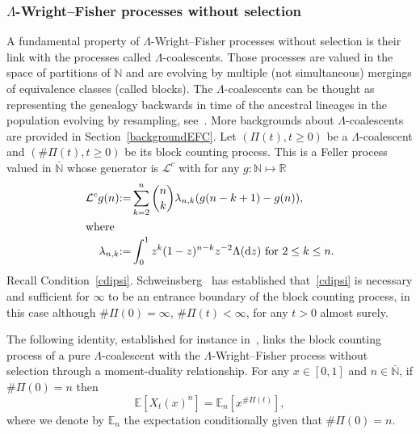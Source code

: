 \documentclass[10pt]{amsart}
\theoremstyle{definition}\newtheorem{defi}[theo]{Definition}\newtheorem{rema}[theo]{Remark}\newtheorem{exam}[theo]{Example}\newtheorem{exem}[theo]{Example}\newtheorem{nota}[theo]{Notation}
\newcommand{\ddr}{\mathrm{d}}
\newcommand{\bbN}{\mathbb{N}}
\newcommand{\bbR}{\mathbb{R}}
\newcommand{\bbE}{\mathbb{E}}
\newcommand{\clL}{\mathcal{L}}
\begin{document}
\subsubsection{\texorpdfstring{$\Lambda$}{Lambda}-Wright--Fisher processes without selection}

A fundamental property of $\Lambda$-Wright--Fisher processes without selection is their link with the processes called $\Lambda$-coalescents. Those processes are valued in the space of partitions of $\bbN$ and are evolving by multiple (not simultaneous) mergings of equivalence classes (called blocks). The $\Lambda$-coalescents can be thought as representing the genealogy backwards in time of the ancestral lineages in the population evolving by resampling, see~\cite{MR1990057}. More backgrounds about $\Lambda$-coalescents are provided in Section~\ref{backgroundEFC}. Let $(\Pi(t),t\geq 0)$ be a $\Lambda$-coalescent and $(\#\Pi(t),t\geq 0)$ be its block counting process. This is a Feller process valued in $\bar{\bbN}$ whose generator is $\clL^{c}$ with for any $g:\bbN\mapsto \bbR$
\begin{align}
\clL^c g(n){:=}&\sum_{k=2}^{n}\binom{n}{k}\lambda_{n,k}(g(n-k+1)-g(n)),\label{coalpart}
\\
\intertext{where}
\lambda_{n,k}{:=}&\int_0^1 z^{k}(1-z)^{n-k}z^{-2}\Lambda(\ddr z) \text{ for } 2\leq k\leq n.\label{lambdank}
\end{align}
Recall Condition~\eqref{cdipsi}. Schweinsberg~\cite{CDI} has established that~\eqref{cdipsi} is necessary and sufficient for $\infty$ to be an entrance boundary of the block counting process, in this case although $\#\Pi(0)=\infty$, $\#\Pi(t)<\infty$, for any $t>0$ almost surely.

The following identity, established for instance in~\cite[Theorem~1, Equation~(8)]{LGB2}, links the block counting process of a pure $\Lambda$-coalescent with the $\Lambda$-Wright--Fisher process without selection through a moment-duality relationship. For any $x\in [0,1]$ and $n\in \bar{\bbN}$, if $\#\Pi(0)=n$ then
\begin{equation}\label{dualclassic}
\bbE\left[X_t(x)^n\right]=\bbE_n\left[x^{\#\Pi(t)}\right],
\end{equation}
where we denote by $\bbE_n$ the expectation conditionally given that $\#\Pi(0)=n$.
\end{document}
